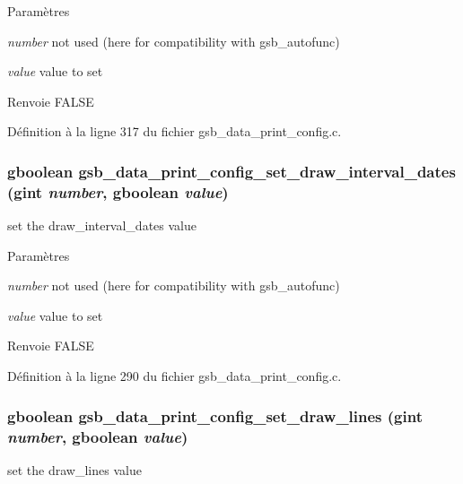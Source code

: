 \begin{DoxyParams}{Paramètres}
\item[{\em number}]not used (here for compatibility with gsb\_\-autofunc) \item[{\em value}]value to set\end{DoxyParams}
\begin{DoxyReturn}{Renvoie}
FALSE 
\end{DoxyReturn}


Définition à la ligne 317 du fichier gsb\_\-data\_\-print\_\-config.c.

\subsubsection[{gsb\_\-data\_\-print\_\-config\_\-set\_\-draw\_\-interval\_\-dates}]{\setlength{\rightskip}{0pt plus 5cm}gboolean gsb\_\-data\_\-print\_\-config\_\-set\_\-draw\_\-interval\_\-dates (gint {\em number}, \/  gboolean {\em value})}\label{gsb__data__print__config_8c_a672a308b8bc95de4e737f7abd610d0b1}
set the draw\_\-interval\_\-dates value


\begin{DoxyParams}{Paramètres}
\item[{\em number}]not used (here for compatibility with gsb\_\-autofunc) \item[{\em value}]value to set\end{DoxyParams}
\begin{DoxyReturn}{Renvoie}
FALSE 
\end{DoxyReturn}


Définition à la ligne 290 du fichier gsb\_\-data\_\-print\_\-config.c.

\subsubsection[{gsb\_\-data\_\-print\_\-config\_\-set\_\-draw\_\-lines}]{\setlength{\rightskip}{0pt plus 5cm}gboolean gsb\_\-data\_\-print\_\-config\_\-set\_\-draw\_\-lines (gint {\em number}, \/  gboolean {\em value})}\label{gsb__data__print__config_8c_acbb938f35f95f8ab78bb62f266ea3143}
set the draw\_\-lines value


